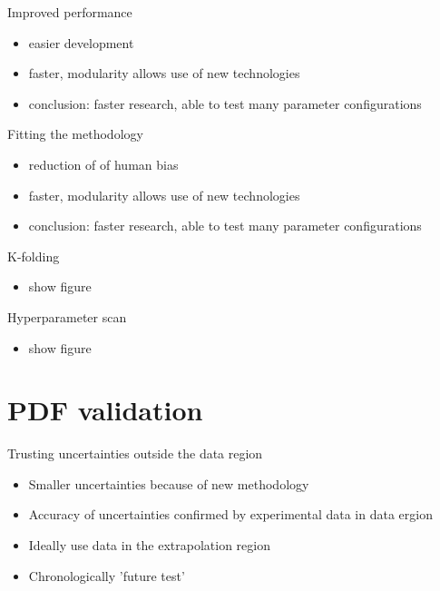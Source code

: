 \documentclass[aspectratio=169]{beamer}
\begin{document}
\begin{frame}{Improved performance}
    \begin{itemize}
        \item easier development
        \item faster, modularity allows use of new technologies
        \item conclusion: faster research, able to test many parameter configurations
    \end{itemize}
\end{frame}


\begin{frame}{Fitting the methodology}
    \begin{itemize}
        \item reduction of of human bias
        \item faster, modularity allows use of new technologies
        \item conclusion: faster research, able to test many parameter configurations
    \end{itemize}
\end{frame}


\begin{frame}{K-folding}
    \begin{itemize}
        \item show figure
    \end{itemize}
\end{frame}


\begin{frame}{Hyperparameter scan}
    \begin{itemize}
        \item show figure
    \end{itemize}
\end{frame}



\section{PDF validation}

\begin{frame}{Trusting uncertainties outside the data region}
    \begin{itemize}
        \item Smaller uncertainties because of new methodology
        \item Accuracy of uncertainties confirmed by experimental data in data ergion
        \item Ideally use data in the extrapolation region
        \item Chronologically 'future test'
    \end{itemize}
\end{frame}
\end{document}
